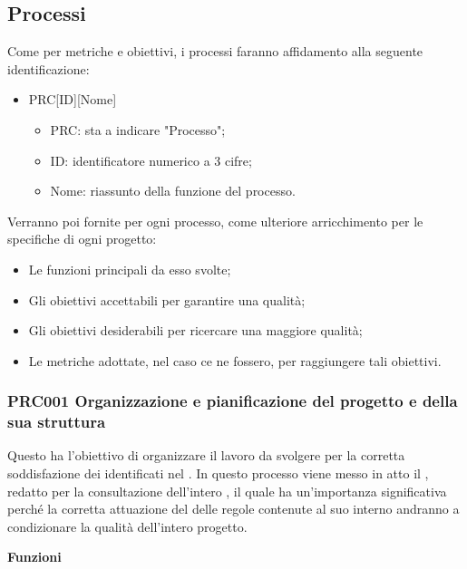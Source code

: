 \documentclass[../paino-di-qualifica.tex]{subfiles}
\begin{document}
\subsection{Processi}%
\label{sub:processi}
Come per metriche e obiettivi, i processi faranno affidamento alla seguente identificazione:
\begin{itemize}
    \item PRC[ID][Nome]
    \begin{itemize}
        \item PRC: sta a indicare "Processo";
        \item ID: identificatore numerico a 3 cifre;
        \item Nome: riassunto della funzione del processo.
    \end{itemize}
\end{itemize}
Verranno poi fornite per ogni processo, come ulteriore arricchimento per le specifiche di ogni progetto:
\begin{itemize}
    \item Le funzioni principali da esso svolte;
    \item Gli obiettivi accettabili per garantire una qualità;
    \item Gli obiettivi desiderabili per ricercare una maggiore qualità;
    \item Le metriche adottate, nel caso ce ne fossero, per raggiungere tali obiettivi.
\end{itemize}

\subsubsection{PRC001 Organizzazione e pianificazione del progetto e della sua struttura}%
\label{sub:organizzazione_e_pianificazione_del_progetto_e_della_sua_struttura}
Questo  ha l'obiettivo di organizzare il lavoro da svolgere per la corretta soddisfazione dei  identificati nel .
In questo processo viene messo in atto il , redatto per la consultazione dell'intero , il quale ha un'importanza significativa perché la corretta attuazione del delle regole contenute al suo interno andranno a condizionare la qualità dell'intero progetto.

\textbf{Funzioni}
\end{document}
